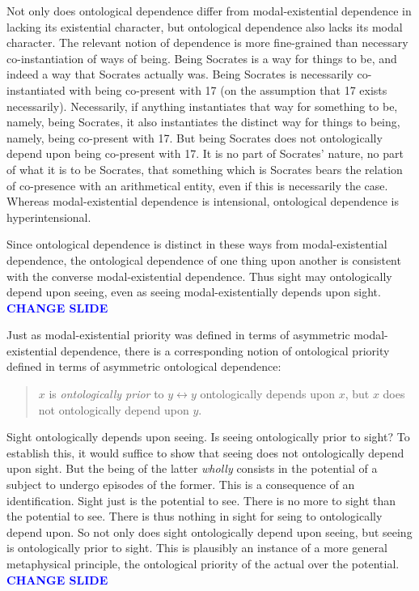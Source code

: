 \documentclass[12pt]{article}
\newcommand{\change}{\textcolor{blue}{\textbf{CHANGE SLIDE}}}
\begin{document}
Not only does ontological dependence differ from modal-existential dependence in lacking its existential character, but ontological dependence also lacks its modal character. The relevant notion of dependence is more fine-grained than necessary co-instantiation of ways of being. Being Socrates is a way for things to be, and indeed a way that Socrates actually was. Being Socrates is necessarily co-instantiated with being co-present with 17 (on the assumption that 17 exists necessarily). Necessarily, if anything instantiates that way for something to be, namely, being Socrates, it also instantiates the distinct way for things to being, namely, being co-present with 17. But being Socrates does not ontologically depend upon being co-present with 17. It is no part of Socrates' nature, no part of what it is to be Socrates, that something which is Socrates bears the relation of co-presence with an arithmetical entity, even if this is necessarily the case. Whereas modal-existential dependence is intensional, ontological dependence is hyperintensional.

Since ontological dependence is distinct in these ways from modal-existential dependence, the ontological dependence of one thing upon another is consistent with the converse modal-existential dependence. Thus sight may ontologically depend upon seeing, even as seeing modal-existentially depends upon sight. \change

Just as modal-existential priority was defined in terms of asymmetric modal-existential dependence, there is a corresponding notion of ontological priority defined in terms of asymmetric ontological dependence:
\begin{quote}
	\( x \) is \emph{ontologically prior} to \( y  \leftrightarrow  y \) ontologically depends upon \( x \), but \( x \) does not ontologically depend upon \( y \).
\end{quote}
% 
Sight ontologically depends upon seeing. Is seeing ontologically prior to sight? To establish this, it would suffice to show that seeing does not ontologically depend upon sight. But the being of the latter \emph{wholly} consists in the potential of a subject to undergo episodes of the former. This is a consequence of an identification. Sight just is the potential to see. There is no more to sight than the potential to see. There is thus nothing in sight for seing to ontologically depend upon. So not only does sight ontologically depend upon seeing, but seeing is ontologically prior to sight. This is plausibly an instance of a more general metaphysical principle, the ontological priority of the actual over the potential. \change
\end{document}
